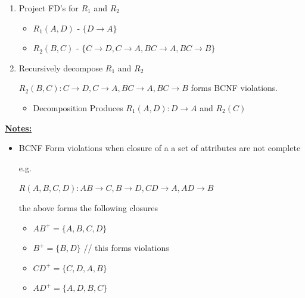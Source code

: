 \documentclass[12pt]{article}
\begin{document}
\begin{enumerate}[1.]
\begin{enumerate}[a)]
\begin{itemize}
\begin{enumerate}[1.]
                \item Project FD's for $R_1$ and $R_2$

                \bigskip

                \begin{itemize}
                    \item $R_1(A,D)$ - \color{red}$\{D \to A\}$\color{black}
                    \item $R_2(B,C)$ - \color{red}$\{C \to D, C \to A, BC \to A, BC \to B\}$\color{black}

                \end{itemize}
                \item Recursively decompose $R_1$ and $R_2$

                \bigskip

                \color{red}$R_2(B,C): C \to D, C \to A, BC \to A, BC \to B$ forms BCNF violations.\color{black}

                \bigskip

                \begin{itemize}
                    \item \color{red}Decomposition Produces $R_1 (A,D): D \to A$ and $R_2 (C)$\color{black}
                \end{itemize}


            \end{enumerate}

        \end{itemize}


    \end{enumerate}

    \bigskip

    \underline{\textbf{Notes:}}

    \bigskip

    \begin{itemize}
        \item BCNF Form violations when closure of a a set of attributes are not complete

        \bigskip

        e.g.


        \bigskip

        $R(A,B,C,D): AB \to C, B \to D, CD \to A, AD \to B$

        \bigskip

        the above forms the following closures


        \begin{itemize}
            \item $AB^+ = \{A, B, C, D\}$
            \item $B^+ = \{B, D\}$ // this forms violations
            \item $CD^+ = \{C, D, A, B\}$
            \item $AD^+ = \{A, D, B, C\}$
        \end{itemize}


\end{itemize}
\end{enumerate}
\end{document}
